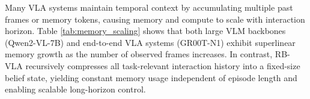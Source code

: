 \documentclass[conference]{IEEEtran}
\begin{document}
Many VLA systems maintain temporal context by accumulating multiple past frames or memory tokens, causing memory and compute to scale with interaction horizon. Table \ref{tab:memory_scaling} shows that both large VLM backbones (Qwen2-VL-7B) and end-to-end VLA systems (GR00T-N1) exhibit superlinear memory growth as the number of observed frames increases. In contrast, RB-VLA recursively compresses all task-relevant interaction history into a fixed-size belief state, yielding constant memory usage independent of episode length and enabling scalable long-horizon control.
\begin{table}[h]
\centering
\renewcommand{\arraystretch}{1.2}
\caption{Relative memory usage as a function of temporal context length, comparing RB-VLA with baseline models.}
\label{tab:memory_scaling}
\end{table}




\end{document}
